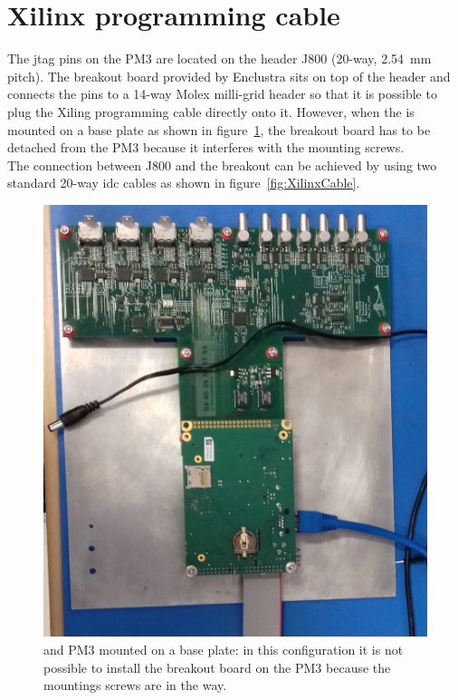 \section{Xilinx programming cable}
The \gls{jtag} pins on the PM3 are located on the header J800 (20-way, 2.54~mm pitch). The breakout board provided by Enclustra sits on top of the header and connects the pins to a 14-way Molex milli-grid header so that it is possible to plug the Xiling programming cable directly onto it. However, when the \brd is mounted on a base plate as shown in figure~\ref{fig:TLUplate}, the breakout board has to be detached from the PM3 because it interferes with the mounting screws.\\
The connection between J800 and the breakout can be achieved by using two standard 20-way \gls{idc} cables as shown in figure~\ref{fig:XilinxCable}.
\begin{figure}[h]
  \centering
  \includegraphics[width=.50\textwidth]{./Images/TLU_plate.jpg}
  \caption{\brd and PM3 mounted on a base plate: in this configuration it is not possible to install the breakout board on the PM3 because the mountings screws are in the way.}\label{fig:TLUplate}
\end{figure}
